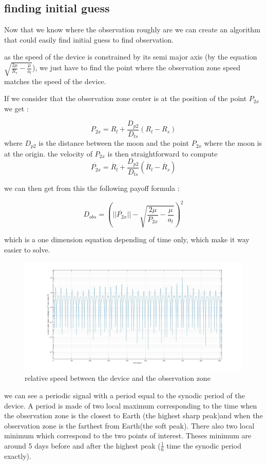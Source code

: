 \documentclass{article} %
\begin{document}
		\subsection{finding initial guess}
		
		Now that we know where the observation roughly are we can create an algorithm that could easily find initial guess to find observation.
		
		as the speed of the device is constrained by its semi major axis (by the equation $\sqrt{\frac{2\mu}{R_s}-\frac{\mu}{a_l}}$), we just have to find the point where the observation zone speed matches the speed of the device.
			
		If we consider that the observation zone center is at the position of the point $P_{2x}$ we get :
		
		$$
		P_{2x}=R_l+\frac{D_{p2}}{D_{ts}}(R_l-R_s)
		$$
		where $D_{p2}$ is the distance between the moon and the point $P_{2x}$ where the moon is at the origin.
		the velocity of $P_{2x}$ is then straightforward to compute
		$$
		\dot{P_{2x}}=\dot{R_l}+\frac{D_{p2}}{D_{ts}}(\dot{R_l}-\dot{R_s})
		$$
		
		we can then get from this the following payoff formula :
		
		$$
		D_{obs}=\left(||\dot{P_{2x}}||-\sqrt{\frac{2\mu}{P_{2x}}-\frac{\mu}{a_l}}\right)^2
		$$  
		
		which is a one dimension equation depending of time only, which make it way easier to solve.
		
		\begin{figure}[h]
			\includegraphics[width=12cm]{images/graph.jpg}
			\caption{relative speed between the device and the observation zone}
		\end{figure}
		
		we can see a periodic signal with a period equal to the synodic period of the device. A period is made of two local maximum corresponding to the time when the observation zone is the closest to Earth (the highest sharp peak)and when the observation zone is the farthest from Earth(the soft peak). There also two local minimum which correspond to the two points of interest. Theses minimum are around 5 days before and after the highest peak ($\frac{1}{6}$ time the synodic period exactly). 
		
\end{document}

